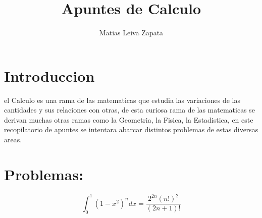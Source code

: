 \documentclass{article}
\title{\textbf{Apuntes de Calculo}}
\author{Matias Leiva Zapata}
\theoremstyle{mytheoremstyle}
\theoremstyle{mytheoremstyle}
\theoremstyle{myproblemstyle}
\begin{document}
\maketitle

\section{Introduccion}
el Calculo es una rama de las matematicas que estudia las variaciones de las cantidades y sus relaciones con otras, 
de esta curiosa rama de las matematicas se derivan muchas otras ramas como la Geometria, la Fisica, la Estadistica,
 en este recopilatorio de apuntes se intentara abarcar distintos problemas de estas diversas areas.

\section{Problemas:}



\begin{problem}
\begin{equation}
    \int_{0}^{1}(1-x^2)^n dx = \frac{2^{2n}{(n!)}^2 }{(2n+1)!}
\end{equation}
\end{problem}
\end{document}
